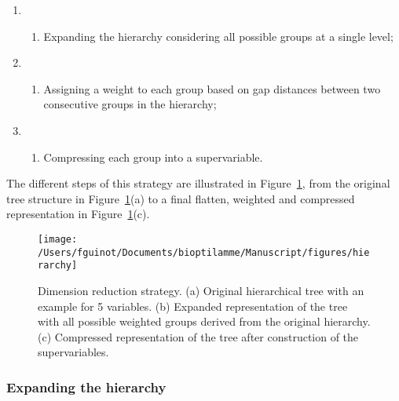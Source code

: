 \documentclass[]{book}
\providecommand{\tightlist}{%
  \setlength{\itemsep}{0pt}\setlength{\parskip}{0pt}}
\begin{document}
\begin{enumerate}
\def\labelenumi{\arabic{enumi}.}
\item
  \begin{enumerate}
  \def\labelenumii{(\alph{enumii})}
  \tightlist
  \item
    Expanding the hierarchy considering all possible groups
    at a single level;
  \end{enumerate}
\item
  \begin{enumerate}
  \def\labelenumii{(\alph{enumii})}
  \setcounter{enumii}{1}
  \tightlist
  \item
    Assigning a weight to each group based on gap distances
    between two consecutive groups in the hierarchy;
  \end{enumerate}
\item
  \begin{enumerate}
  \def\labelenumii{(\alph{enumii})}
  \setcounter{enumii}{1}
  \tightlist
  \item
    Compressing each group into a supervariable.
  \end{enumerate}
\end{enumerate}

The different steps of this strategy are illustrated in
Figure~\ref{fig:hierarchy}, from the original tree structure in
Figure~\ref{fig:hierarchy}(a) to a final flatten, weighted and compressed
representation in Figure~\ref{fig:hierarchy}(c).



\begin{figure}

{\centering \texttt{[image: /Users/fguinot/Documents/bioptilamme/Manuscript/figures/hierarchy]} 

}

\caption{Dimension reduction strategy. (a) Original hierarchical tree with an example for 5 variables. (b) Expanded representation of the tree with all possible weighted groups derived from the original hierarchy. (c) Compressed representation of the tree after construction of the supervariables.}\label{fig:hierarchy}
\end{figure}

\hypertarget{expanding-the-hierarchy}{%
\subsubsection*{Expanding the hierarchy}\label{expanding-the-hierarchy}}
\end{document}
